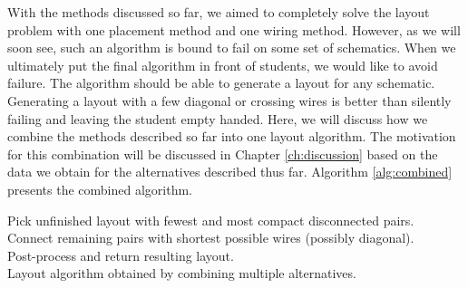With the methods discussed so far, we aimed to completely solve the layout problem
with one placement method and one wiring method. However, as we will soon see,
such an algorithm is bound to fail on some set of schematics. When we ultimately
put the final algorithm in front of students, we would like to avoid failure.
The algorithm should be able to generate a layout for any schematic.
Generating a layout
with a few diagonal or crossing wires is better than silently failing and leaving
the student empty handed. Here, we will discuss how we combine the methods
described so far into one layout algorithm. The motivation for this combination
will be discussed in Chapter \ref{ch:discussion} based on the data we obtain
for the alternatives described thus far.
Algorithm \ref{alg:combined} presents the
combined algorithm.

\begin{algorithm}
\BlankLine
{}
Pick unfinished layout with fewest and most compact disconnected pairs.\\
Connect remaining pairs with shortest possible wires (possibly diagonal).\\
Post-process and return resulting layout.\\
\caption{Layout algorithm obtained by combining multiple alternatives.}
\label{alg:combined}
\end{algorithm}

